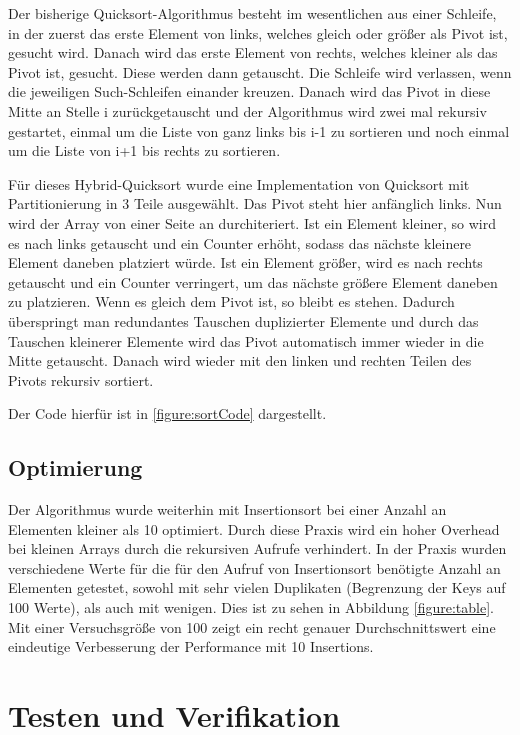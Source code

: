 \documentclass[11pt]{scrartcl}
\begin{document}
		Der bisherige Quicksort-Algorithmus besteht im wesentlichen aus einer Schleife, in der zuerst das erste Element von links, welches gleich oder größer als Pivot ist, gesucht wird.
		Danach wird das erste Element von rechts, welches kleiner als das Pivot ist, gesucht. Diese werden dann getauscht.
		Die Schleife wird verlassen, wenn die jeweiligen Such-Schleifen einander kreuzen.
		Danach wird das Pivot in diese Mitte an Stelle i zurückgetauscht und der Algorithmus wird zwei mal rekursiv gestartet,
		einmal um die Liste von ganz links bis i-1 zu sortieren und noch einmal um die Liste von i+1 bis rechts zu sortieren.

		Für dieses Hybrid-Quicksort wurde eine Implementation von Quicksort mit Partitionierung in 3 Teile ausgewählt.
		Das Pivot steht hier anfänglich links. Nun wird der Array von einer Seite an durchiteriert.
		Ist ein Element kleiner, so wird es nach links getauscht und ein Counter erhöht, sodass das nächste kleinere Element daneben platziert würde.
		Ist ein Element größer, wird es nach rechts getauscht und ein Counter verringert, um das nächste größere Element daneben zu platzieren.
		Wenn es gleich dem Pivot ist, so bleibt es stehen. 
		Dadurch überspringt man redundantes Tauschen duplizierter Elemente und durch das Tauschen kleinerer Elemente wird das Pivot automatisch immer wieder in die Mitte getauscht.
		Danach wird wieder mit den linken und rechten Teilen des Pivots rekursiv sortiert.

		Der Code hierfür ist in \ref{figure:sortCode} dargestellt.

	\subsection{Optimierung}
		\label{sec:optAlgo}

		Der Algorithmus wurde weiterhin mit Insertionsort bei einer Anzahl an Elementen kleiner als 10 optimiert.
		Durch diese Praxis wird ein hoher Overhead bei kleinen Arrays durch die rekursiven Aufrufe verhindert.
		In der Praxis wurden verschiedene Werte für die für den Aufruf von Insertionsort benötigte Anzahl an Elementen getestet,
		sowohl mit sehr vielen Duplikaten (Begrenzung der Keys auf 100 Werte), als auch mit wenigen.
		Dies ist zu sehen in Abbildung \ref{figure:table}. 
		Mit einer Versuchsgröße von 100 zeigt ein recht genauer Durchschnittswert eine eindeutige Verbesserung der Performance mit 10 Insertions.

\section{Testen und Verifikation}
\label{sec:vertests}
\end{document}
